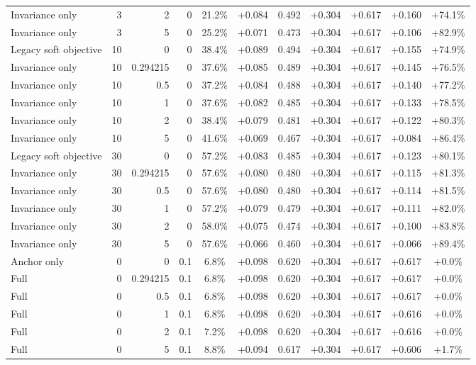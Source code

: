 \begin{table}[htbp]
\begin{tabular}{lrrrccccccc}
Invariance only & 3 & 2 & 0 & 21.2\% & +0.084 & 0.492 & +0.304 & +0.617 & +0.160 & +74.1\% \\
Invariance only & 3 & 5 & 0 & 25.2\% & +0.071 & 0.473 & +0.304 & +0.617 & +0.106 & +82.9\% \\
Legacy soft objective & 10 & 0 & 0 & 38.4\% & +0.089 & 0.494 & +0.304 & +0.617 & +0.155 & +74.9\% \\
Invariance only & 10 & 0.294215 & 0 & 37.6\% & +0.085 & 0.489 & +0.304 & +0.617 & +0.145 & +76.5\% \\
Invariance only & 10 & 0.5 & 0 & 37.2\% & +0.084 & 0.488 & +0.304 & +0.617 & +0.140 & +77.2\% \\
Invariance only & 10 & 1 & 0 & 37.6\% & +0.082 & 0.485 & +0.304 & +0.617 & +0.133 & +78.5\% \\
Invariance only & 10 & 2 & 0 & 38.4\% & +0.079 & 0.481 & +0.304 & +0.617 & +0.122 & +80.3\% \\
Invariance only & 10 & 5 & 0 & 41.6\% & +0.069 & 0.467 & +0.304 & +0.617 & +0.084 & +86.4\% \\
Legacy soft objective & 30 & 0 & 0 & 57.2\% & +0.083 & 0.485 & +0.304 & +0.617 & +0.123 & +80.1\% \\
Invariance only & 30 & 0.294215 & 0 & 57.6\% & +0.080 & 0.480 & +0.304 & +0.617 & +0.115 & +81.3\% \\
Invariance only & 30 & 0.5 & 0 & 57.6\% & +0.080 & 0.480 & +0.304 & +0.617 & +0.114 & +81.5\% \\
Invariance only & 30 & 1 & 0 & 57.2\% & +0.079 & 0.479 & +0.304 & +0.617 & +0.111 & +82.0\% \\
Invariance only & 30 & 2 & 0 & 58.0\% & +0.075 & 0.474 & +0.304 & +0.617 & +0.100 & +83.8\% \\
Invariance only & 30 & 5 & 0 & 57.6\% & +0.066 & 0.460 & +0.304 & +0.617 & +0.066 & +89.4\% \\
Anchor only & 0 & 0 & 0.1 & 6.8\% & +0.098 & 0.620 & +0.304 & +0.617 & +0.617 & +0.0\% \\
Full & 0 & 0.294215 & 0.1 & 6.8\% & +0.098 & 0.620 & +0.304 & +0.617 & +0.617 & +0.0\% \\
Full & 0 & 0.5 & 0.1 & 6.8\% & +0.098 & 0.620 & +0.304 & +0.617 & +0.617 & +0.0\% \\
Full & 0 & 1 & 0.1 & 6.8\% & +0.098 & 0.620 & +0.304 & +0.617 & +0.616 & +0.0\% \\
Full & 0 & 2 & 0.1 & 7.2\% & +0.098 & 0.620 & +0.304 & +0.617 & +0.616 & +0.0\% \\
Full & 0 & 5 & 0.1 & 8.8\% & +0.094 & 0.617 & +0.304 & +0.617 & +0.606 & +1.7\% \\

\end{tabular}
\end{table}
